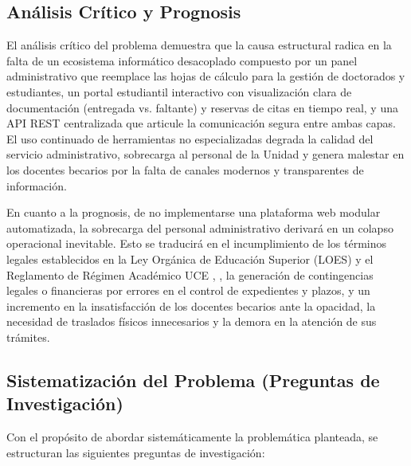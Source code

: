 \subsection{Análisis Crítico y Prognosis}

El análisis crítico del problema demuestra que la causa estructural radica en la falta de un ecosistema informático desacoplado compuesto por un panel administrativo que reemplace las hojas de cálculo para la gestión de doctorados y estudiantes, un portal estudiantil interactivo con visualización clara de documentación (entregada vs. faltante) y reservas de citas en tiempo real, y una API REST centralizada que articule la comunicación segura entre ambas capas. El uso continuado de herramientas no especializadas degrada la calidad del servicio administrativo, sobrecarga al personal de la Unidad y genera malestar en los docentes becarios por la falta de canales modernos y transparentes de información.

En cuanto a la prognosis, de no implementarse una plataforma web modular automatizada, la sobrecarga del personal administrativo derivará en un colapso operacional inevitable. Esto se traducirá en el incumplimiento de los términos legales establecidos en la Ley Orgánica de Educación Superior (LOES) y el Reglamento de Régimen Académico UCE \cite{loes}, \cite{reglamento_uce}, la generación de contingencias legales o financieras por errores en el control de expedientes y plazos, y un incremento en la insatisfacción de los docentes becarios ante la opacidad, la necesidad de traslados físicos innecesarios y la demora en la atención de sus trámites.

\subsection{Sistematización del Problema (Preguntas de Investigación)}

Con el propósito de abordar sistemáticamente la problemática planteada, se estructuran las siguientes preguntas de investigación:

